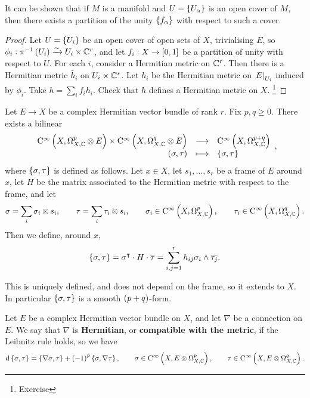 It can be shown that if $ M $ is a manifold and $ U = \cbr{U_\alpha} $ is an open cover of $ M $, then there exists a partition of the unity $ \cbr{f_\alpha} $ with respect to such a cover.

\begin{proof}
Let $ U = \cbr{U_i} $ be an open cover of open sets of $ X $, trivialising $ E $, so $ \phi_i : \pi^{-1}\br{U_i} \xrightarrow{\sim} U_i \times \CC^r $, and let $ f_i : X \to \sbr{0, 1} $ be a partition of unity with respect to $ U $. For each $ i $, consider a Hermitian metric on $ \mathbb{C}^r $. Then there is a Hermitian metric $ \widetilde{h_i} $ on $ U_i \times \mathbb{C}^r $. Let $ h_i $ be the Hermitian metric on $ \left. E \right|_{U_i} $ induced by $ \phi_i $. Take $ h = \sum_i f_ih_i $. Check that $ h $ defines a Hermitian metric on $ X $. \footnote{Exercise}
\end{proof}


Let $ E \to X $ be a complex Hermitian vector bundle of rank $ r $. Fix $ p, q \ge 0 $. There exists a bilinear
$$ \function{\C^\infty\br{X, \Omega_{X, \CC}^p \otimes E} \times \C^\infty\br{X, \Omega_{X, \CC}^q \otimes E}}{\C^\infty\br{X, \Omega_{X, \CC}^{p + q}}}{\br{\sigma, \tau}}{\cbr{\sigma, \tau}}, $$
where $ \cbr{\sigma, \tau} $ is defined as follows. Let $ x \in X $, let $ s_1, \dots, s_r $ be a frame of $ E $ around $ x $, let $ H $ be the matrix associated to the Hermitian metric with respect to the frame, and let
$$ \sigma = \sum_i \sigma_i \otimes s_i, \qquad \tau = \sum_i \tau_i \otimes s_i, \qquad \sigma_i \in \C^\infty\br{X, \Omega_{X, \CC}^p}, \qquad \tau_i \in \C^\infty\br{X, \Omega_{X, \CC}^q}. $$
Then we define, around $ x $,
$$ \cbr{\sigma, \tau} = \sigma^\intercal \cdot H \cdot \overline{\tau} = \sum_{i, j = 1}^r h_{ij}\sigma_i \wedge \overline{\tau_j}. $$

This is uniquely defined, and does not depend on the frame, so it extends to $ X $. In particular $ \cbr{\sigma, \tau} $ is a smooth $ \br{p + q} $-form.

\pagebreak

\begin{definition}
Let $ E $ be a complex Hermitian vector bundle on $ X $, and let $ \nabla $ be a connection on $ E $. We say that $ \nabla $ is \textbf{Hermitian}, or \textbf{compatible with the metric}, if the Leibnitz rule holds, so we have
$$ \d\cbr{\sigma, \tau} = \cbr{\nabla\sigma, \tau} + \br{-1}^p\cbr{\sigma, \nabla\tau}, \qquad \sigma \in \C^\infty\br{X, E \otimes \Omega_{X, \CC}^p}, \qquad \tau \in \C^\infty\br{X, E \otimes \Omega_{X, \CC}^q}. $$
\end{definition}

